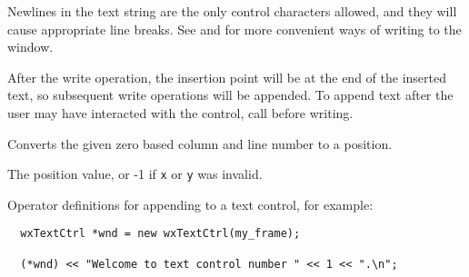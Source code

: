 
Newlines in the text string
are the only control characters allowed, and they will cause appropriate
line breaks.  See  and  for more convenient ways of writing to the window.

After the write operation, the insertion point will be at the end of the inserted text, so subsequent write operations will be appended. To append text after the user may have interacted with the control, call  before writing.


\label{wxtextctrlxytoposition}


Converts the given zero based column and line number to a position.





The position value, or -1 if {\tt x} or {\tt y} was invalid.


\label{wxtextctrlinsert}







Operator definitions for appending to a text control, for example:

\begin{verbatim}
  wxTextCtrl *wnd = new wxTextCtrl(my_frame);

  (*wnd) << "Welcome to text control number " << 1 << ".\n";
\end{verbatim}


